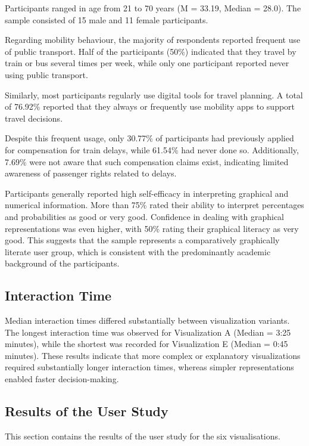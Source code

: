 \documentclass[final,journal,a4paper]{IEEEtran}
\begin{document}
Participants ranged in age from 21 to 70 years (M = 33.19, Median = 28.0). The sample consisted of 15 male and 11 female participants.

Regarding mobility behaviour, the majority of respondents reported frequent use of public transport. Half of the participants (50\%) indicated that they travel by train or bus several times per week, while only one participant reported never using public transport.

Similarly, most participants regularly use digital tools for travel planning.
A total of 76.92\% reported that they always or frequently use mobility apps to support travel decisions.

Despite this frequent usage, only 30.77\% of participants had previously applied for compensation for train delays, while 61.54\% had never done so. Additionally, 7.69\% were not aware that such compensation claims exist, indicating limited awareness of passenger rights related to delays.

Participants generally reported high self-efficacy in interpreting graphical and numerical information. More than 75\% rated their ability to interpret percentages and probabilities as good or very good. Confidence in dealing with graphical representations was even higher, with 50\% rating their graphical literacy as very good. This suggests that the sample represents a comparatively graphically literate user group, which is consistent with the predominantly academic background of the participants.

\subsection{Interaction Time}
Median interaction times differed substantially between visualization variants. The longest interaction time was observed for Visualization A (Median = 3:25 minutes), while the shortest was recorded for Visualization E (Median = 0:45 minutes). These results indicate that more complex or explanatory visualizations required substantially longer interaction times, whereas simpler representations enabled faster decision-making.

\subsection{Results of the User Study}
This section contains the results of the user study for the six visualisations.
\end{document}
